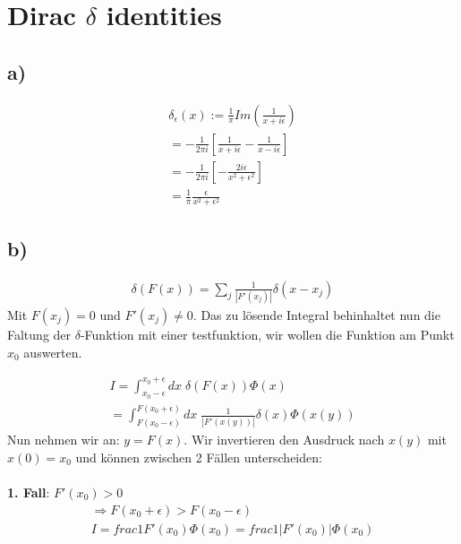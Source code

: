 \section{Dirac $\delta$ identities}

\subsection{a)}

\begin{align}
\delta_{\epsilon} \left(x\right) := \frac{1}{\pi} Im \left(
\frac{1}{x+i\epsilon} \right) \\
= - \frac{1}{2\pi i} \left[ \frac{1}{x+ i\epsilon} - \frac{1}{x- i\epsilon}
\right] \\
= - \frac{1}{2 \pi i} \left[ - \frac{2 i \epsilon}{x^2 + \epsilon^2} \right] \\
= \frac{1}{\pi} \frac{\epsilon}{x^2 + \epsilon^2}
\end{align}

\subsection{b)}

\begin{align}
\delta \left( F\left(x\right) \right) = \sum_j \frac{1}{|F' \left(x_j\right)|}
\delta \left(x-x_j\right)
\end{align}
Mit $F\left(x_j\right)=0$ und $F'\left(x_j\right) \neq 0$. Das zu l\"osende
Integral behinhaltet nun die Faltung der $\delta$-Funktion mit einer
testfunktion, wir wollen die Funktion am Punkt $x_0$ auswerten.

\begin{align}
I = \int_{x_0-\epsilon}^{x_0+\epsilon} dx \; \delta \left( F\left(x\right)
\right) \Phi \left(x\right) \\
= \int_{F\left(x_0-\epsilon\right)}^{F\left(x_0+\epsilon\right)} dx \;
\frac{1}{|F' \left(x\left(y\right) \right)|} \delta \left(x\right) \Phi
\left(x\left(y\right) \right)
\end{align}
Nun nehmen wir an: $y = F \left(x\right)$.
Wir invertieren den Ausdruck nach $x\left(y\right)$ mit $x\left(0\right)=x_0$
und k\"onnen zwischen 2 F\"allen unterscheiden:\\
\\
\textbf{1. Fall}: $F'\left(x_0\right) > 0$
\begin{align}
\Rightarrow F \left(x_0 + \epsilon \right) > F \left(x_0 - \epsilon \right) \\
I = frac{1}{F' \left(x_0 \right)} \Phi \left(x_0\right) = frac{1}{|F' \left(x_0
\right)|} \Phi \left(x_0\right)
\end{align}

